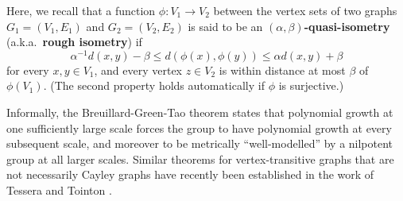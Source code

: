 Here, we recall that a function $\phi:V_1\to V_2$ between the vertex sets of two graphs $G_1=(V_1,E_1)$ and $G_2=(V_2,E_2)$ is said to be an $(\alpha,\beta)$\textbf{-quasi-isometry} (a.k.a.\ \textbf{rough isometry}) if 
\[\alpha^{-1} d(x,y) -\beta \leq d(\phi(x),\phi(y)) \leq \alpha d(x,y) +\beta\]
for every $x,y\in V_1$, and every vertex $z\in V_2$ is within distance at most $\beta$ of $\phi(V_1)$. (The second property holds automatically if $\phi$ is surjective.)

\medskip

Informally, the Breuillard-Green-Tao theorem states that polynomial growth at one sufficiently large scale forces the group to have polynomial growth at every subsequent scale, and moreover to be metrically ``well-modelled'' by a nilpotent group at all larger scales. Similar theorems for vertex-transitive graphs that are not necessarily Cayley graphs have recently been established in the work of Tessera and Tointon \cite{tt.Trof,MR3877012}.
